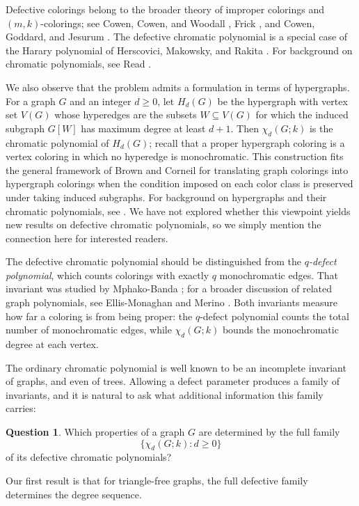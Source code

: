 \documentclass[12pt,reqno]{amsart}
\theoremstyle{definition}
\newtheorem{quest}[thm]{Question}
\begin{document}
Defective colorings belong to the broader theory of improper colorings and $(m,k)$-colorings; see Cowen, Cowen, and Woodall \cite{CCW86}, Frick \cite{Fri93}, and Cowen, Goddard, and Jesurum \cite{CGJ97}. The defective chromatic polynomial is a special case of the Harary polynomial of Herscovici, Makowsky, and Rakita \cite{HMR21}. For background on chromatic polynomials, see Read \cite{Rea68}.

We also observe that the problem admits a formulation in terms of hypergraphs. For a graph $G$ and an integer $d\geq 0$, let $H_d(G)$ be the hypergraph with vertex set $V(G)$ whose hyperedges are the subsets $W\subseteq V(G)$ for which the induced subgraph $G[W]$ has maximum degree at least $d+1$. Then $\chi_d(G;k)$ is the chromatic polynomial of $H_d(G)$; recall that a proper hypergraph coloring is a vertex coloring in which no hyperedge is monochromatic. This construction fits the general framework of Brown and Corneil \cite{BC91} for translating graph colorings into hypergraph colorings when the condition imposed on each color class is preserved under taking induced subgraphs. For background on hypergraphs and their chromatic polynomials, see \cite{Ber73,ZD20}. We have not explored whether this viewpoint yields new results on defective chromatic polynomials, so we simply mention the connection here for interested readers.

The defective chromatic polynomial should be distinguished from the \emph{$q$-defect polynomial}, which counts colorings with exactly $q$ monochromatic edges. That invariant was studied by Mphako-Banda \cite{M-B19}; for a broader discussion of related graph polynomials, see Ellis-Monaghan and Merino \cite{E-MM11}. Both invariants measure how far a coloring is from being proper: the $q$-defect polynomial counts the total number of monochromatic edges, while $\chi_d(G;k)$ bounds the monochromatic degree at each vertex.

The ordinary chromatic polynomial is well known to be an incomplete invariant of graphs, and even of trees. Allowing a defect parameter produces a family of invariants, and it is natural to ask what additional information this family carries:

\begin{quest}
Which properties of a graph $G$ are determined by the full family
\[
\{\chi_d(G;k): d\geq 0\}
\]
of its defective chromatic polynomials?
\end{quest}

Our first result is that for triangle-free graphs, the full defective family determines the degree sequence.
\end{document}
